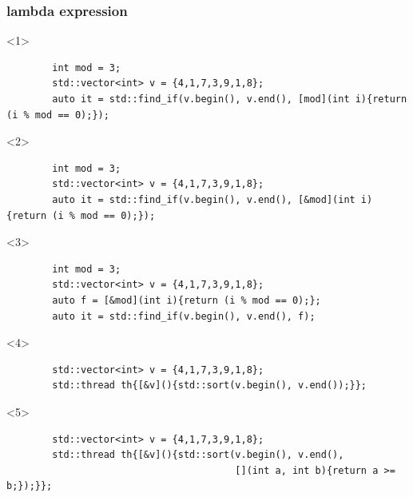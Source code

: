 \documentclass{beamer}
\begin{document}
\begin{frame}[fragile]
\frametitle{lambda expression}
    \begin{onlyenv}<1>
    \begin{lstlisting}
        int mod = 3;
        std::vector<int> v = {4,1,7,3,9,1,8};
        auto it = std::find_if(v.begin(), v.end(), [mod](int i){return (i % mod == 0);});
    \end{lstlisting}
    \end{onlyenv}
    \begin{onlyenv}<2>
    \begin{lstlisting}
        int mod = 3;
        std::vector<int> v = {4,1,7,3,9,1,8};
        auto it = std::find_if(v.begin(), v.end(), [&mod](int i){return (i % mod == 0);});
    \end{lstlisting}
    \end{onlyenv}
    \begin{onlyenv}<3>
    \begin{lstlisting}
        int mod = 3;
        std::vector<int> v = {4,1,7,3,9,1,8};
        auto f = [&mod](int i){return (i % mod == 0);};
        auto it = std::find_if(v.begin(), v.end(), f);
    \end{lstlisting}
    \end{onlyenv}
    \begin{onlyenv}<4>
    \begin{lstlisting}
        std::vector<int> v = {4,1,7,3,9,1,8};
        std::thread th{[&v](){std::sort(v.begin(), v.end());}};
    \end{lstlisting}
    \end{onlyenv}
    \begin{onlyenv}<5>
    \begin{lstlisting}
        std::vector<int> v = {4,1,7,3,9,1,8};
        std::thread th{[&v](){std::sort(v.begin(), v.end(), 
                                        [](int a, int b){return a >= b;});}};
    \end{lstlisting}
    \end{onlyenv}
\end{frame}
\end{document}
